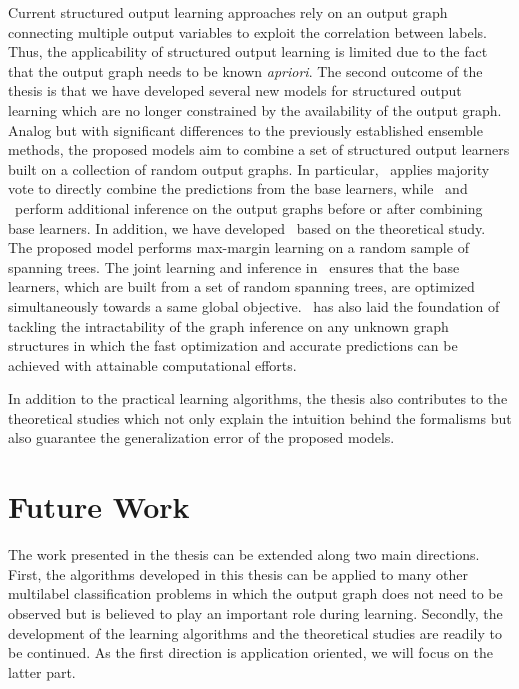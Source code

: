 {Current structured output learning approaches rely on an output graph connecting multiple output variables to exploit the correlation between labels.
Thus, the applicability of structured output learning is limited due to the fact that the output graph needs to be known \textit{apriori}.
The second outcome of the thesis is that we have developed several new models for structured output learning which are no longer constrained by the availability of the output graph.
Analog but with significant differences to the previously established ensemble methods, the proposed models aim to combine a set of structured output learners built on a collection of random output graphs.
In particular, \mve\ applies majority vote to directly combine the predictions from the base learners, while \amm\ and \mam\ perform additional inference on the output graphs before or after combining base learners.
In addition, we have developed \rta\ based on the theoretical study.
The proposed model performs max-margin learning on a random sample of spanning trees.
The joint learning and inference in \rta\ ensures that the base learners, which are built from a set of random spanning trees, are optimized simultaneously towards a same global objective.
\rta\ has also laid the foundation of tackling the intractability of the graph inference on any unknown graph structures in which the fast optimization and accurate predictions can be achieved with attainable computational efforts.

In addition to the practical learning algorithms, the thesis also contributes to the theoretical studies which not only explain the intuition behind the formalisms but also guarantee the generalization error of the proposed models.



\section{Future Work}

The work presented in the thesis can be extended along two main directions.
First, the algorithms developed in this thesis can be applied to many other multilabel classification problems in which the output graph does not need to be observed but is believed to play an important role during learning.
Secondly, the development of the learning algorithms and the theoretical studies are readily to be continued.
As the first direction is application oriented, we will focus on the latter part.

}
